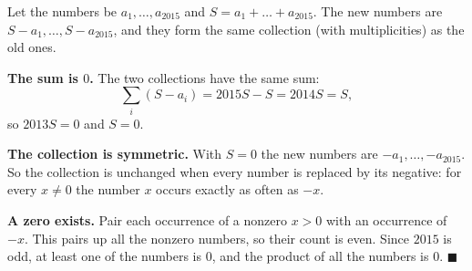 Let the numbers be $a_1,\dots,a_{2015}$ and $S=a_1+\dots+a_{2015}$. The new numbers are $S-a_1,\dots,S-a_{2015}$, and they form the same collection (with multiplicities) as the old ones.

\textbf{The sum is $0$.} The two collections have the same sum:
\[
\sum_{i}(S-a_i)=2015S-S=2014S=S ,
\]
so $2013S=0$ and $S=0$.

\textbf{The collection is symmetric.} With $S=0$ the new numbers are $-a_1,\dots,-a_{2015}$. So the collection is unchanged when every number is replaced by its negative: for every $x\ne0$ the number $x$ occurs exactly as often as $-x$.

\textbf{A zero exists.} Pair each occurrence of a nonzero $x>0$ with an occurrence of $-x$. This pairs up all the nonzero numbers, so their count is even. Since $2015$ is odd, at least one of the numbers is $0$, and the product of all the numbers is $0$. $\blacksquare$
